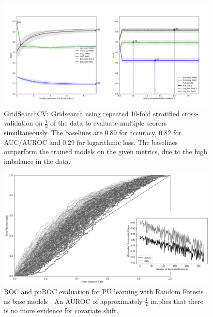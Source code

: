 \begin{figure}[ht]
\centering
   \includegraphics[scale=0.38,angle=0]{fig/gridfigure}
\captionsetup{width= 400pt}
\caption{GridSearchCV: Gridsearch using repeated 10-fold stratified cross-validation on \(\frac{1}{2}\) of the data to evaluate multiple scorers simultaneously. The baselines are 0.89 for accuracy, 0.82 for AUC/AUROC and 0.29 for logarithmic loss. The baselines outperform the trained models on the given metrics, due to the high imbalance in the data.}
   \label{fig:Ng1} 
\end{figure}

\begin{figure}[ht]
\centering
   \includegraphics[scale=0.40,angle=0]{fig/res}
\captionsetup{width= 360pt}
\caption{ROC and puROC evaluation for PU learning with Random Forests as base models \cite{breiman2}. An AUROC of approximately \(\frac{1}{2}\) implies that there is no more evidence for covariate shift.}
   \label{fig:Ng1} 
\end{figure}

